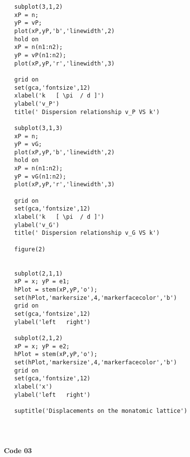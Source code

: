 \begin{framed}
\begin{verbatim}
   subplot(3,1,2)
   xP = n; 
   yP = vP;
   plot(xP,yP,'b','linewidth',2)
   hold on
   xP = n(n1:n2); 
   yP = vP(n1:n2);
   plot(xP,yP,'r','linewidth',3)
   
   grid on
   set(gca,'fontsize',12)
   xlabel('k   [ \pi  / d ]')
   ylabel('v_P')
   title(' Dispersion relationship v_P VS k')
   
   subplot(3,1,3)
   xP = n; 
   yP = vG;
   plot(xP,yP,'b','linewidth',2)
   hold on
   xP = n(n1:n2);
   yP = vG(n1:n2);
   plot(xP,yP,'r','linewidth',3)
   
   grid on
   set(gca,'fontsize',12)
   xlabel('k   [ \pi  / d ]')
   ylabel('v_G')
   title(' Dispersion relationship v_G VS k')
   
   figure(2)
   
 
   subplot(2,1,1)
   xP = x; yP = e1;
   hPlot = stem(xP,yP,'o');
   set(hPlot,'markersize',4,'markerfacecolor','b')
   grid on
   set(gca,'fontsize',12)
   ylabel('left   right')
   
   subplot(2,1,2)
   xP = x; yP = e2;
   hPlot = stem(xP,yP,'o');
   set(hPlot,'markersize',4,'markerfacecolor','b')
   grid on
   set(gca,'fontsize',12)
   xlabel('x')
   ylabel('left   right')

   suptitle('Displacements on the monatomic lattice')

   
 
\end{verbatim}
   \end{framed}        

\newpage

\textbf{\Large Code 03}\\


